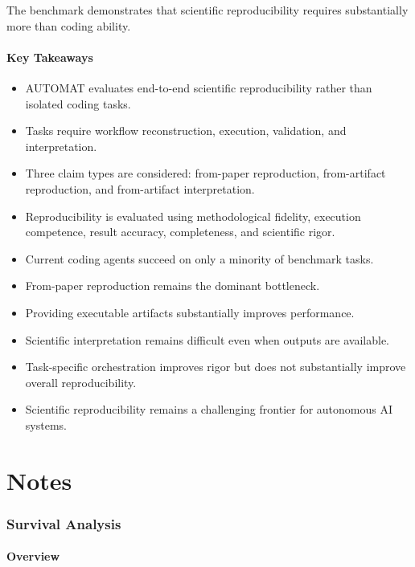 \documentclass[11pt]{article}
\begin{document}
The benchmark demonstrates that scientific reproducibility requires substantially more than coding ability.

\subsection*{Key Takeaways}

\begin{itemize}
    \item AUTOMAT evaluates end-to-end scientific reproducibility rather than isolated coding tasks.
    \item Tasks require workflow reconstruction, execution, validation, and interpretation.
    \item Three claim types are considered: from-paper reproduction, from-artifact reproduction, and from-artifact interpretation.
    \item Reproducibility is evaluated using methodological fidelity, execution competence, result accuracy, completeness, and scientific rigor.
    \item Current coding agents succeed on only a minority of benchmark tasks.
    \item From-paper reproduction remains the dominant bottleneck.
    \item Providing executable artifacts substantially improves performance.
    \item Scientific interpretation remains difficult even when outputs are available.
    \item Task-specific orchestration improves rigor but does not substantially improve overall reproducibility.
    \item Scientific reproducibility remains a challenging frontier for autonomous AI systems.
\end{itemize}
\newpage
\part{Notes}

\section{Survival Analysis}

\subsection*{Overview}
\end{document}
